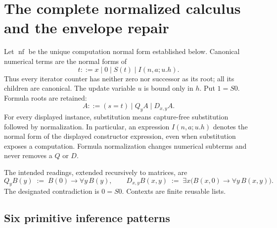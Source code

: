 \section{The complete normalized calculus and the envelope repair}
\label{env:calculus}

Let $\operatorname{nf}$ be the unique computation normal form established
below. Canonical numerical terms are the normal forms of
\[
 t::=x\mid0\mid S(t)\mid I(n,a;u.h).
\]
Thus every iterator counter has neither zero nor successor as its root;
all its children are canonical. The update variable $u$ is bound only in
$h$. Put $1=S0$. Formula roots are retained:
\[
 A::=(s=t)\mid Q_y A\mid D_{x,y}A.
\]
For every displayed instance, substitution means capture-free substitution
followed by normalization. In particular, an expression
$I(n,a;u.h)$ denotes the normal form of the displayed constructor
expression, even when substitution exposes a computation. Formula
normalization changes numerical subterms and never removes a $Q$ or $D$.

The intended readings, extended recursively to matrices, are
\[
 Q_yB(y)\;:=\;B(0)\to\forall y\,B(y),\qquad
 D_{x,y}B(x,y)\;:=\;\exists x\bigl(B(x,0)\to\forall y\,B(x,y)\bigr).
\]
The designated contradiction is $0=S0$. Contexts are finite reusable lists.

\subsection{Six primitive inference patterns}

